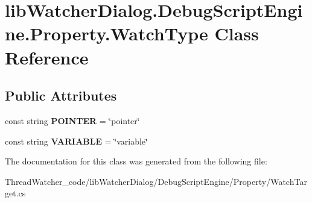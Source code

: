 \hypertarget{classlib_watcher_dialog_1_1_debug_script_engine_1_1_property_1_1_watch_type}{\section{lib\+Watcher\+Dialog.\+Debug\+Script\+Engine.\+Property.\+Watch\+Type Class Reference}
\label{classlib_watcher_dialog_1_1_debug_script_engine_1_1_property_1_1_watch_type}
}
\subsection*{Public Attributes}
\begin{DoxyCompactItemize}
\item 
\hypertarget{classlib_watcher_dialog_1_1_debug_script_engine_1_1_property_1_1_watch_type_ae75c85c474c461e9d818a7adf1a1a27c}{const string {\bfseries P\+O\+I\+N\+T\+E\+R} = \char`\"{}pointer\char`\"{}}\label{classlib_watcher_dialog_1_1_debug_script_engine_1_1_property_1_1_watch_type_ae75c85c474c461e9d818a7adf1a1a27c}

\item 
\hypertarget{classlib_watcher_dialog_1_1_debug_script_engine_1_1_property_1_1_watch_type_a899fb4773d59989c21947e226d87e8c3}{const string {\bfseries V\+A\+R\+I\+A\+B\+L\+E} = \char`\"{}variable\char`\"{}}\label{classlib_watcher_dialog_1_1_debug_script_engine_1_1_property_1_1_watch_type_a899fb4773d59989c21947e226d87e8c3}

\end{DoxyCompactItemize}


The documentation for this class was generated from the following file\+:\begin{DoxyCompactItemize}
\item 
Thread\+Watcher\+\_\+code/lib\+Watcher\+Dialog/\+Debug\+Script\+Engine/\+Property/Watch\+Target.\+cs\end{DoxyCompactItemize}
